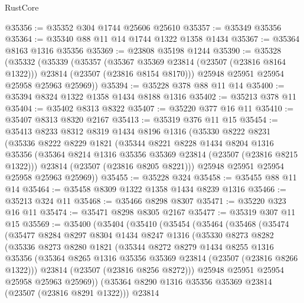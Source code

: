 \begin{lexlean}{RustCore}
\begin{coremodule}
@35356 := @35352 @304 @1744 @25606 @25610
@35357 := @35349 @35356
@35364 := @35340 @88 @11 @14 @1744 @1322 @1358 @1434
@35367 := @35364 @8163 @1316 @35356
@35369 := @23808 @35198 @1244
@35390 := @35328
    (@35332
      (@35339
        (@35357
          (@35367 @35369 @23814 (@23507 (@23816 @8164 @1322)))
          @23814
          (@23507 (@23816 @8154 @8170)))
        @25948
        @25951
        @25954
        @25958
        @25963
        @25969))
@35394 := @35228 @378 @88 @11 @14
@35400 := @35394 @8324 @1322 @1358 @1434 @8188 @1316
@35402 := @35213 @378 @11
@35404 := @35402 @8313 @8322
@35407 := @35220 @377 @16 @11
@35410 := @35407 @8313 @8320 @2167
@35413 := @35319 @376 @11 @15
@35454 := @35413
    @8233
    @8312
    @8319
    @1434
    @8196
    @1316
    (@35330
      @8222
      @8231
      (@35336
        @8222
        @8229
        @1821
        (@35344
          @8221
          @8228
          @1434
          @8204
          @1316
          @35356
          (@35364 @8214 @1316 @35356 @35369 @23814 (@23507 (@23816 @8215 @1322)))
          @23814
          (@23507 (@23816 @8205 @8221)))
        @25948
        @25951
        @25954
        @25958
        @25963
        @25969))
@35455 := @35228 @324
@35458 := @35455 @88 @11 @14
@35464 := @35458 @8309 @1322 @1358 @1434 @8239 @1316
@35466 := @35213 @324 @11
@35468 := @35466 @8298 @8307
@35471 := @35220 @323 @16 @11
@35474 := @35471 @8298 @8305 @2167
@35477 := @35319 @307 @11 @15
@35569 := @35400
    (@35404
      (@35410
        (@35454
          (@35464
            (@35468
              (@35474
                (@35477
                  @8284
                  @8297
                  @8304
                  @1434
                  @8247
                  @1316
                  (@35330
                    @8273
                    @8282
                    (@35336
                      @8273
                      @8280
                      @1821
                      (@35344
                        @8272
                        @8279
                        @1434
                        @8255
                        @1316
                        @35356
                        (@35364 @8265 @1316 @35356 @35369 @23814 (@23507 (@23816 @8266 @1322)))
                        @23814
                        (@23507 (@23816 @8256 @8272)))
                      @25948
                      @25951
                      @25954
                      @25958
                      @25963
                      @25969))
                  (@35364 @8290 @1316 @35356 @35369 @23814 (@23507 (@23816 @8291 @1322)))
                  @23814

\end{coremodule}
\end{lexlean}
